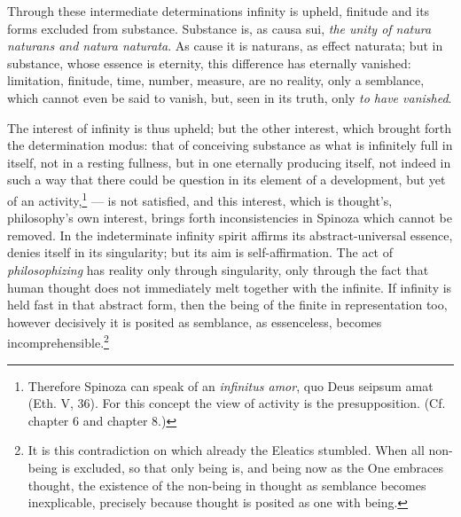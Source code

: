 \documentclass[12pt,a4paper,openany]{book}
\newcommand{\opage}[1]{\marginnote{\footnotesize\textit{[#1]}}}
\begin{document}
Through these intermediate determinations infinity is upheld, finitude and
its forms excluded from substance. Substance is, as causa sui,
\emph{the unity of natura naturans and natura naturata}. As cause it is
naturans, as effect naturata; but in substance, whose essence is
eternity, this difference has eternally vanished: limitation, finitude,
time, number, measure, are no reality, only a semblance, which cannot even
be said to vanish, but, seen in its truth, only \emph{to have
vanished}.

The interest of infinity is thus upheld; but the other
interest, which brought forth the determination modus: that of conceiving
substance as what is infinitely full in itself, not in a resting fullness,
but in one eternally producing
itself, not indeed in such a way that there could be question in its element
of a development, but yet of an
activity,\footnote{Therefore Spinoza can speak of an \emph{infinitus
amor}, quo Deus seipsum amat (Eth. V, 36). For this concept the
view of activity is the presupposition. (Cf. chapter 6 and chapter 8.)}
--- is not satisfied, and this interest, which is
\opage{62}\setcounter{footnote}{0}thought's, philosophy's own interest, brings forth inconsistencies
in Spinoza which cannot be removed. In the indeterminate
infinity spirit affirms its abstract-universal essence, denies
itself in its singularity; but its aim is self-affirmation. The act of \emph{philosophizing}
has reality only through singularity, only through the fact that
human thought does not immediately melt together with the
infinite. If infinity is held fast in that abstract form, then
the being of the finite in representation too, however
decisively it is posited as semblance, as essenceless, becomes
incomprehensible.\footnote{It is this contradiction on which already
the Eleatics stumbled. When all non-being is excluded, so that only being is,
and being now as the One embraces thought, the existence of the non-being
in thought as semblance becomes inexplicable, precisely because thought
is posited as one with being.}
\end{document}
